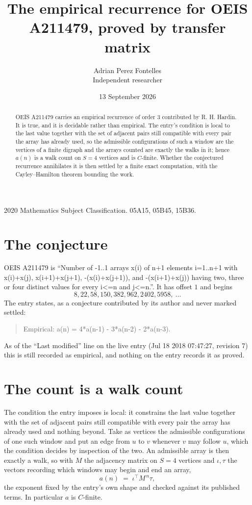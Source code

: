 \documentclass[11pt,a4paper]{article}
\title{The empirical recurrence for OEIS A211479, proved by transfer matrix}
\author{Adrian Perez Fontelles\\ \small Independent researcher}
\date{13 September 2026}
\theoremstyle{plain}
\theoremstyle{definition}
\begin{document}
\maketitle

\begin{abstract}
OEIS A211479 carries an empirical recurrence of order $3$ contributed by R. H. Hardin. It is
true, and it is decidable rather than empirical. The entry's condition is local to the last value together with the set of adjacent pairs still compatible with every pair the array has already used, so
the admissible configurations of such a window are the vertices of a finite digraph and the
arrays counted are exactly the walks in it; hence $a(n)$ is a walk count on $S=4$ vertices
and is $C$-finite. Whether the conjectured recurrence annihilates it is then settled by a
finite exact computation, with the Cayley--Hamilton theorem bounding the work.
\end{abstract}

\noindent\small 2020 Mathematics Subject Classification. 05A15, 05B45, 15B36.\normalsize

\section{The conjecture}

OEIS A211479 is ``Number of -1..1 arrays x(i) of n+1 elements i=1..n+1 with x(i)+x(j), x(i+1)+x(j+1), -(x(i)+x(j+1)), and -(x(i+1)+x(j)) having two, three or four distinct values for every i<=n and j<=n.''. It has offset $1$ and begins
\[
8, 22, 58, 150, 382, 962, 2402, 5958,\ \dots
\]
The entry states, as a conjecture contributed by its author and never marked settled:
\begin{quote}
Empirical: a(n) = 4*a(n-1) - 3*a(n-2) - 2*a(n-3).
\end{quote}
As of the ``Last modified'' line on the live entry (Jul 18 2018 07:47:27, revision 7) this is still
recorded as empirical, and nothing on the entry records it as proved.

\section{The count is a walk count}

The condition the entry imposes is local: it constrains the last value together with the set of adjacent pairs still compatible with every pair the array has already used and nothing beyond. Take as
vertices the admissible configurations of one such window and put an edge from $u$ to $v$
whenever $v$ may follow $u$, which the condition decides by inspection of the two. An
admissible array is then exactly a walk, so with $M$ the adjacency matrix on $S=4$ vertices
and $\iota,\tau$ the vectors recording which windows may begin and end an array,
\[
a(n)\;=\;\iota^{\!\top}M^{\,n}\tau ,
\]
the exponent fixed by the entry's own shape and checked against its published terms. In
particular $a$ is $C$-finite.
\end{document}
